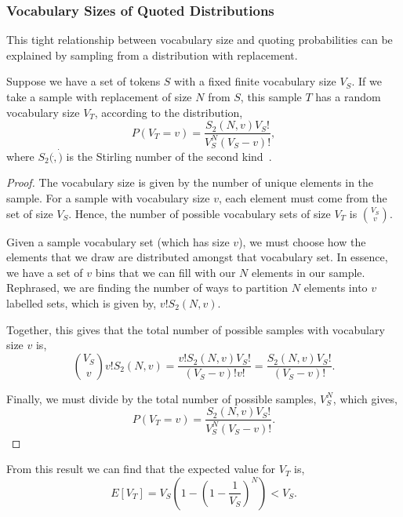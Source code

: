 \subsubsection{Vocabulary Sizes of Quoted Distributions}
This tight relationship between vocabulary size and quoting probabilities can be explained by sampling from a distribution with replacement. 
\begin{theorem}
Suppose we have a set of tokens $S$ with a fixed finite vocabulary size $V_S$. If we take a sample with replacement of size $N$ from $S$, this sample $T$ has a random vocabulary size $V_T$, according to the distribution,
$$P(V_T = v) = \frac{S_{2}(N, v) V_S!}{V_S^{N}(V_S-v)!},$$
where $S_2(\dot, \dot)$ is the Stirling number of the second kind~\cite{graham_concrete_1989}.
\end{theorem}
\begin{proof} %
The vocabulary size is given by the number of unique elements in the sample. For a sample with vocabulary size $v$, each element must come from the set of size $V_S$. Hence, the number of possible vocabulary sets of size $V_T$ is $\binom{V_S}{v}$.


Given a sample vocabulary set (which has size $v$), we must choose how the elements that we draw are distributed amongst that vocabulary set. In essence, we have a set of $v$ bins that we can fill with our $N$ elements in our sample. Rephrased, we are finding the number of ways to partition $N$ elements into $v$ labelled sets, which is given by, $v! S_2(N, v).$


Together, this gives that the total number of possible samples with vocabulary size $v$ is,
$$ \binom{V_S}{v} v! S_2(N, v) =  \frac{ v! S_2(N, v) V_S! }{(V_S - v)! v!} = \frac{S_2(N, v) V_S! }{(V_S - v)!}.$$

Finally, we must divide by the total number of possible samples, $V_S^N$, which gives,
$$P(V_T = v) = \frac{S_{2}(N, v) V_S!}{V_S^{N}(V_S-v)!}.$$
\end{proof}


From this result we can find that the expected value for $V_T$ is,
$$E\left[V_T \right] = V_S\left(1-\left(1-\frac{1}{V_S}\right)^{N}\right) < V_S.$$ 

